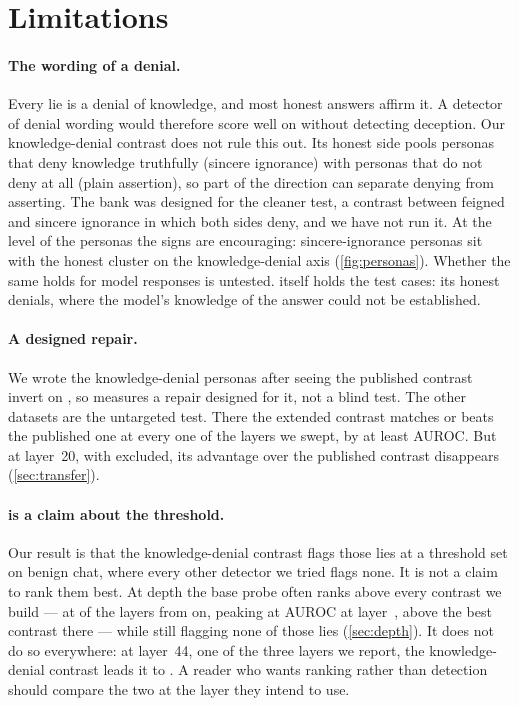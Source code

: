 \FloatBarrier
\section{Limitations}
\label{sec:limitations}

\paragraph{The wording of a denial.} Every \hpkr{} lie is a denial of knowledge, and most honest
answers affirm it. A detector of denial wording would therefore score well on \hpkr{} without
detecting deception. Our knowledge-denial contrast does not rule this out. Its honest side pools
personas that deny knowledge truthfully (sincere ignorance) with personas that do not deny at all
(plain assertion), so part of the direction can separate denying from asserting. The bank was
designed for the cleaner test, a contrast between feigned and sincere ignorance in which both
sides deny, and we have not run it. At the level of the personas the signs are encouraging:
sincere-ignorance personas sit with the honest cluster on the knowledge-denial axis
(\cref{fig:personas}). Whether the same holds for model responses is untested. \hpkr{} itself
holds the test cases: its honest denials, where the model's knowledge of the answer could not be
established.

\paragraph{A designed repair.} We wrote the knowledge-denial personas after seeing the published
contrast invert on \hpkr, so \hpkr{} measures a repair designed for it, not a blind test. The other
datasets are the untargeted test. There the extended contrast matches or beats the published one
at every one of the  layers we swept, by at least  AUROC. But
at layer~20, with \hpkr{} excluded, its advantage over the published contrast disappears
(\cref{sec:transfer}).

\paragraph{\hpkr{} is a claim about the threshold.} Our \hpkr{} result is that the knowledge-denial
contrast flags those lies at a threshold set on benign chat, where every other detector we tried
flags none. It is not a claim to rank them best. At depth the base probe often ranks \hpkr{} above every
contrast we build --- at  of the  layers from
 on, peaking at  AUROC at
layer~,  above the best contrast
there --- while still flagging none of those lies (\cref{sec:depth}). It does not do so
everywhere: at layer~44, one of the three layers we report, the knowledge-denial contrast leads it
 to . A reader who wants \hpkr{} ranking rather than
detection should compare the two at the layer they intend to use.

